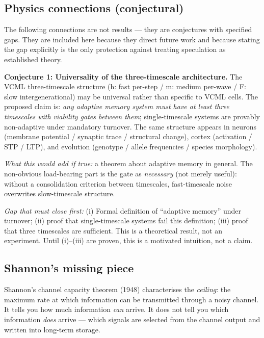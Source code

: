 \documentclass[11pt]{article}
\begin{document}
\subsection{Physics connections (conjectural)}

The following connections are not results --- they are conjectures with specified gaps.
They are included here because they direct future work and because stating the gap
explicitly is the only protection against treating speculation as established theory.

\textbf{Conjecture 1: Universality of the three-timescale architecture.}
The VCML three-timescale structure (h: fast per-step / m: medium per-wave / F: slow
intergenerational) may be universal rather than specific to VCML cells.
The proposed claim is: \emph{any adaptive memory system must have at least three timescales
with viability gates between them}; single-timescale systems are provably non-adaptive
under mandatory turnover.
The same structure appears in neurons (membrane potential / synaptic trace / structural
change), cortex (activation / STP / LTP), and evolution (genotype / allele frequencies /
species morphology).

\textit{What this would add if true:} a theorem about adaptive memory in general.
The non-obvious load-bearing part is the gate as \emph{necessary} (not merely useful):
without a consolidation criterion between timescales, fast-timescale noise overwrites
slow-timescale structure.

\textit{Gap that must close first:}
(i) Formal definition of ``adaptive memory'' under turnover;
(ii) proof that single-timescale systems fail this definition;
(iii) proof that three timescales are sufficient.
This is a theoretical result, not an experiment.
Until (i)--(iii) are proven, this is a motivated intuition, not a claim.


\subsection{Shannon's missing piece}

Shannon's channel capacity theorem (1948) characterises the \emph{ceiling}:
the maximum rate at which information can be transmitted through a noisy channel.
It tells you how much information \emph{can} arrive.
It does not tell you which information \emph{does} arrive --- which signals are
selected from the channel output and written into long-term storage.
\end{document}
